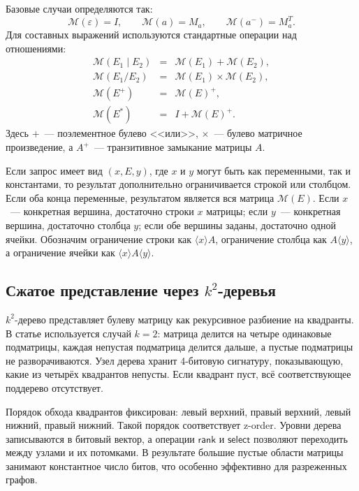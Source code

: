 Базовые случаи определяются так:
\[
    \mathcal{M}(\varepsilon) = I, \qquad
    \mathcal{M}(a) = M_a, \qquad
    \mathcal{M}(a^{-}) = M_a^T.
\]
Для составных выражений используются стандартные операции над отношениями:
\[
\begin{array}{rcl}
    \mathcal{M}(E_1 \mid E_2) &=& \mathcal{M}(E_1) + \mathcal{M}(E_2),\\
    \mathcal{M}(E_1 / E_2) &=& \mathcal{M}(E_1) \times \mathcal{M}(E_2),\\
    \mathcal{M}(E^+) &=& \mathcal{M}(E)^+,\\
    \mathcal{M}(E^*) &=& I + \mathcal{M}(E)^+.
\end{array}
\]
Здесь $+$~--- поэлементное булево <<или>>, $\times$~--- булево матричное произведение, а $A^+$~--- транзитивное замыкание матрицы $A$.

Если запрос имеет вид $(x,E,y)$, где $x$ и $y$ могут быть как переменными, так и константами, то результат дополнительно ограничивается строкой или столбцом. Если оба конца переменные, результатом является вся матрица $\mathcal{M}(E)$. Если $x$~--- конкретная вершина, достаточно строки $x$ матрицы; если $y$~--- конкретная вершина, достаточно столбца $y$; если обе вершины заданы, достаточно одной ячейки. Обозначим ограничение строки как $\langle x\rangle A$, ограничение столбца как $A\langle y\rangle$, а ограничение ячейки как $\langle x\rangle A\langle y\rangle$.

\subsection{Сжатое представление через $k^2$-деревья}
\label{subsec:RPQ_Arroyuelo_k2tree}

$k^2$-дерево представляет булеву матрицу как рекурсивное разбиение на квадранты. В статье используется случай $k=2$: матрица делится на четыре одинаковые подматрицы, каждая непустая подматрица делится дальше, а пустые подматрицы не разворачиваются. Узел дерева хранит 4-битовую сигнатуру, показывающую, какие из четырёх квадрантов непусты. Если квадрант пуст, всё соответствующее поддерево отсутствует.

Порядок обхода квадрантов фиксирован: левый верхний, правый верхний, левый нижний, правый нижний. Такой порядок соответствует z-order. Уровни дерева записываются в битовый вектор, а операции $\mathsf{rank}$ и $\mathsf{select}$ позволяют переходить между узлами и их потомками. В результате большие пустые области матрицы занимают константное число битов, что особенно эффективно для разреженных графов.

